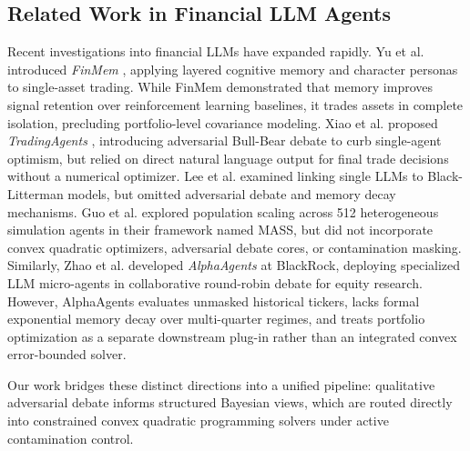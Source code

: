 \documentclass[conference]{IEEEtran}
\begin{document}
\subsection{Related Work in Financial LLM Agents}

Recent investigations into financial LLMs have expanded rapidly. Yu et al. introduced \textit{FinMem} \cite{yu2023finmem}, applying layered cognitive memory and character personas to single-asset trading. While FinMem demonstrated that memory improves signal retention over reinforcement learning baselines, it trades assets in complete isolation, precluding portfolio-level covariance modeling. Xiao et al. proposed \textit{TradingAgents} \cite{xiao2024tradingagents}, introducing adversarial Bull-Bear debate to curb single-agent optimism, but relied on direct natural language output for final trade decisions without a numerical optimizer. Lee et al. \cite{lee2025llmbl} examined linking single LLMs to Black-Litterman models, but omitted adversarial debate and memory decay mechanisms. Guo et al. \cite{guo2024mass} explored population scaling across 512 heterogeneous simulation agents in their framework named MASS, but did not incorporate convex quadratic optimizers, adversarial debate cores, or contamination masking. Similarly, Zhao et al. \cite{zhao2025alphaagents} developed \textit{AlphaAgents} at BlackRock, deploying specialized LLM micro-agents in collaborative round-robin debate for equity research. However, AlphaAgents evaluates unmasked historical tickers, lacks formal exponential memory decay over multi-quarter regimes, and treats portfolio optimization as a separate downstream plug-in rather than an integrated convex error-bounded solver.

Our work bridges these distinct directions into a unified pipeline: qualitative adversarial debate informs structured Bayesian views, which are routed directly into constrained convex quadratic programming solvers under active contamination control.
\end{document}
